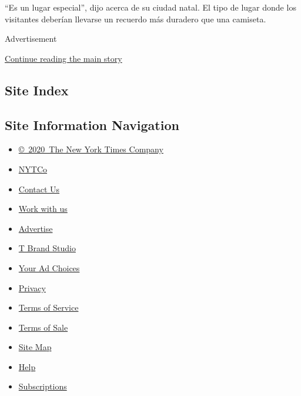 ``Es un lugar especial'', dijo acerca de su ciudad natal. El tipo de
lugar donde los visitantes deberían llevarse un recuerdo más duradero
que una camiseta.

Advertisement

\protect\hyperlink{after-bottom}{Continue reading the main story}

\hypertarget{site-index}{%
\subsection{Site Index}\label{site-index}}

\hypertarget{site-information-navigation}{%
\subsection{Site Information
Navigation}\label{site-information-navigation}}

\begin{itemize}
\tightlist
\item
  \href{https://help.nytimes3xbfgragh.onion/hc/en-us/articles/115014792127-Copyright-notice}{©~2020~The
  New York Times Company}
\end{itemize}

\begin{itemize}
\tightlist
\item
  \href{https://www.nytco.com/}{NYTCo}
\item
  \href{https://help.nytimes3xbfgragh.onion/hc/en-us/articles/115015385887-Contact-Us}{Contact
  Us}
\item
  \href{https://www.nytco.com/careers/}{Work with us}
\item
  \href{https://nytmediakit.com/}{Advertise}
\item
  \href{http://www.tbrandstudio.com/}{T Brand Studio}
\item
  \href{https://www.nytimes3xbfgragh.onion/privacy/cookie-policy\#how-do-i-manage-trackers}{Your
  Ad Choices}
\item
  \href{https://www.nytimes3xbfgragh.onion/privacy}{Privacy}
\item
  \href{https://help.nytimes3xbfgragh.onion/hc/en-us/articles/115014893428-Terms-of-service}{Terms
  of Service}
\item
  \href{https://help.nytimes3xbfgragh.onion/hc/en-us/articles/115014893968-Terms-of-sale}{Terms
  of Sale}
\item
  \href{https://spiderbites.nytimes3xbfgragh.onion}{Site Map}
\item
  \href{https://help.nytimes3xbfgragh.onion/hc/en-us}{Help}
\item
  \href{https://www.nytimes3xbfgragh.onion/subscription?campaignId=37WXW}{Subscriptions}
\end{itemize}
